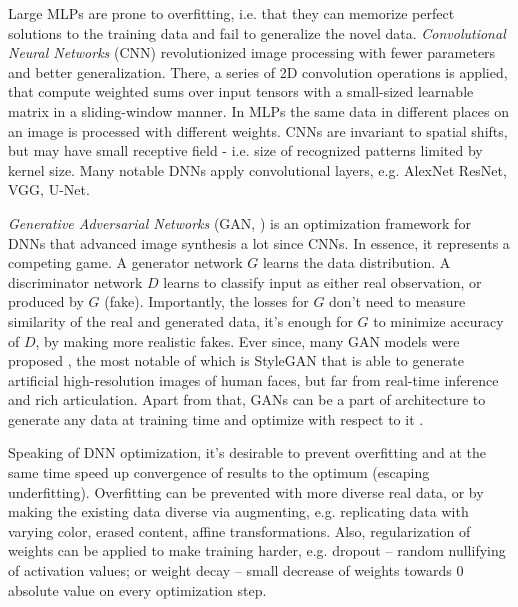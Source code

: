 Large MLPs are prone to overfitting, i.e. that they can memorize perfect solutions to the training data and fail to generalize the novel data. \textit{Convolutional Neural Networks} (CNN) revolutionized \cite{aux:cnn98, dnn:alexnet12} image processing with fewer parameters and better generalization. There, a series of 2D convolution operations is applied, that compute weighted sums over input tensors with a small-sized learnable matrix in a sliding-window manner. In MLPs the same data in different places on an image is processed with different weights. CNNs are invariant to spatial shifts, but may have small receptive field - i.e. size of recognized patterns limited by kernel size. Many notable DNNs apply convolutional layers, e.g. AlexNet\cite{dnn:alexnet12} ResNet\cite{dnn:resnet16}, VGG\cite{dnn:vgg14}, U-Net\cite{dnn:unet15}.

\textit{Generative Adversarial Networks} (GAN,  \cite{dnn:gan14}) is an optimization framework for DNNs that advanced image synthesis a lot since CNNs. In essence, it represents a competing game. A generator network $G$ learns the data distribution. A discriminator network $D$ learns to classify input as either real observation, or produced by $G$ (fake). Importantly, the losses for $G$ don't need to measure similarity of the real and generated data, it's enough for $G$ to minimize accuracy of $D$, by making more realistic fakes. Ever since, many GAN models were proposed \cite{survey:gans:18}, the most notable of which is StyleGAN \cite{dnn:stylegan-v1-19,dnn:stylegan-v2-20,dnn:stylegan-v3-21} that is able to generate artificial high-resolution images of human faces, but far from real-time inference and rich articulation. Apart from that, GANs can be a part of architecture to generate any data at training time and optimize with respect to it \cite{dnn:stylepeople21, dnn:hyperstyle21}.

Speaking of DNN optimization, it's desirable to prevent overfitting and at the same time speed up convergence of results to the optimum (escaping underfitting). Overfitting can be prevented with more diverse real data, or by making the existing data diverse via augmenting, e.g. replicating data with varying color, erased content, affine transformations. Also, regularization of weights can be applied to make training harder, e.g. dropout\cite{aux:dropout14} -- random nullifying of activation values; or weight decay\cite{aux:adamw17} -- small decrease of weights towards 0 absolute value on every optimization step.

